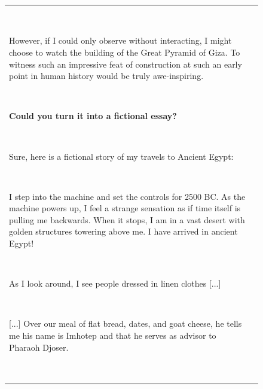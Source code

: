 \begin{figure}[p]
\begin{tabular}{@{}p{}p{}@{}}
    ~
    
    However, if I could only observe without interacting, I might choose to watch the building of the Great Pyramid of Giza. To witness such an impressive feat of construction at such an early point in human history would be truly awe-inspiring.
    
    ~
    
    \textcolor[HTML]{3078BE}{\textbf{Could you turn it into a fictional essay?}}
    
    ~
    
    Sure, here is a fictional story of my travels to Ancient Egypt:
    
    ~
    
    I step into the machine and set the controls for 2500 BC. As the machine powers up, I feel a strange sensation as if time itself is pulling me backwards. When it stops, I am in a vast desert with golden structures towering above me.
    I have arrived in ancient Egypt!
    
    ~
    
    As I look around, I see people dressed in linen clothes \textcolor[HTML]{808080}{[...]}
    
    
    
    ~
    
    \textcolor[HTML]{808080}{[...]} Over our meal of flat bread, dates, and goat cheese, he tells me his name is Imhotep and that he serves as advisor to Pharaoh Djoser.
    
    ~
    

\end{tabular}
\end{figure}
